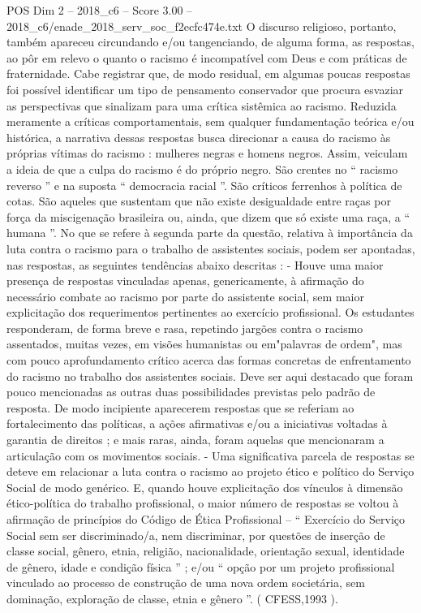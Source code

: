 \begin{textsample}{POS Dim 2 – 2018\_c6 – Score 3.00 – 2018\_c6/enade\_2018\_serv\_soc\_f2ecfc474e.txt}
O discurso religioso, portanto, também apareceu circundando e/ou tangenciando, de alguma forma, as respostas, ao pôr em relevo o quanto o racismo é incompatível com Deus e com práticas de fraternidade.
Cabe registrar que, de modo residual, em algumas poucas respostas foi possível identificar um tipo de pensamento conservador que procura esvaziar as perspectivas que sinalizam para uma crítica sistêmica ao racismo.
Reduzida meramente a críticas comportamentais, sem qualquer fundamentação teórica e/ou histórica, a narrativa dessas respostas busca direcionar a causa do racismo às próprias vítimas do racismo : mulheres negras e homens negros.
Assim, veiculam a ideia de que a culpa do racismo é do próprio negro.
São crentes no “ racismo reverso ” e na suposta “ democracia racial ”.
São críticos ferrenhos à política de cotas.
São aqueles que sustentam que não existe desigualdade entre raças por força da miscigenação brasileira ou, ainda, que dizem que só existe uma raça, a “ humana ”.
No que se refere à segunda parte da questão, relativa à importância da luta contra o racismo para o trabalho de assistentes sociais, podem ser apontadas, nas respostas, as seguintes tendências abaixo descritas : - Houve uma maior presença de respostas vinculadas apenas, genericamente, à afirmação do necessário combate ao racismo por parte do assistente social, sem maior explicitação dos requerimentos pertinentes ao exercício profissional.
Os estudantes responderam, de forma breve e rasa, repetindo jargões contra o racismo assentados, muitas vezes, em visões humanistas ou em"palavras de ordem", mas com pouco aprofundamento crítico acerca das formas concretas de enfrentamento do racismo no trabalho dos assistentes sociais.
Deve ser aqui destacado que foram pouco mencionadas as outras duas possibilidades previstas pelo padrão de resposta.
De modo incipiente aparecerem respostas que se referiam ao fortalecimento das políticas, a ações afirmativas e/ou a iniciativas voltadas à garantia de direitos ; e mais raras, ainda, foram aquelas que mencionaram a articulação com os movimentos sociais. - Uma significativa parcela de respostas se deteve em relacionar a luta contra o racismo ao projeto ético e político do Serviço Social de modo genérico.
E, quando houve explicitação dos vínculos à dimensão ético-política do trabalho profissional, o maior número de respostas se voltou à afirmação de princípios do Código de Ética Profissional – “ Exercício do Serviço Social sem ser discriminado/a, nem discriminar, por questões de inserção de classe social, gênero, etnia, religião, nacionalidade, orientação sexual, identidade de gênero, idade e condição física ” ; e/ou “ opção por um projeto profissional vinculado ao processo de construção de uma nova ordem societária, sem dominação, exploração de classe, etnia e gênero ”. ( CFESS,1993 ).

\end{textsample}
